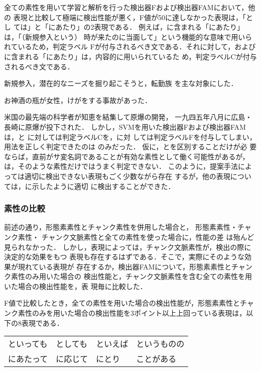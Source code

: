 \documentclass[japanese]{jnlp_1.2d}
\newlength{\NearBaselineskip}
\newcommand{\uline}[1]{}
\newcounter{example}
\newenvironment{example}{}{}
\newcommand{\strref}[1]{}
\newcommand{\tabref}[1]{}
\begin{document}
全ての素性を用いて学習と解析を行った検出器Fおよび検出器FAMにおいて，他の
表現と比較して極端に検出性能が悪く，F値が50に達しなかった表現は，「とし
ては」と「にあたり」の2表現である．
例えば，\strref{ex:niatari-F}に含まれる「にあたり」は，「（新規参入という） 
時が来たのに当面して」という機能的な意味で用いられているため，判定ラベル
Fが付与されるべき文である．それに対して，\strref{ex:niatari-C}および
\strref{ex:niatari-C2}に含まれる「にあたり」は，内容的に用いられているた
め，判定ラベルCが付与されるべき文である．
\begin{example}
  \item 新規参入{\kern0pt}\uline{にあたり}，潜在的なニーズを掘り起こそうと，転勤族
	を主な対象にした．\label{ex:niatari-F} 
  \item お神酒の瓶が女性{\kern0pt}\uline{にあたり}，けがをする事故があった．
	\label{ex:niatari-C} 
  \item 米国の最先端の科学者が知恵を結集して原爆の開発{\kern0pt}\uline{にあたり}，
	一九四五年八月に広島・長崎に原爆が投下された．
	\label{ex:niatari-C2} 
\end{example}
しかし，SVMを用いた検出器Fおよび検出器FAMは，\strref{ex:niatari-F}と
\strref{ex:niatari-C}に対しては判定ラベルCを，\strref{ex:niatari-C2}に対
しては判定ラベルFを付与してしまい，用法を正しく判定できたのは
\strref{ex:niatari-C}のみだった．
仮に，\strref{ex:niatari-F}と\strref{ex:niatari-C}を区別することだけが必
要ならば，直前がサ変名詞であることが有効な素性として働く可能性があるが，
\strref{ex:niatari-C2}は，そのような素性だけではうまく判定できない．
このように，提案手法によっては適切に検出できない表現もごく少数ながら存在
するが，他の表現については，\tabref{tab:kekka_gaiyou}に示したように適切
に検出することができた．


\subsubsection{素性の比較}
前述の通り，形態素素性とチャンク素性を併用した場合と，
\pagebreak
形態素素性・チャンク素性・
チャンク文脈素性と全ての素性を使った場合に，性能の差
は殆んど見られなかった．
しかし，表現によっては，チャンク文脈素性が，検出の際に決定的な効果をもつ
表現も存在するはずである．そこで，実際にそのような効果が現れている表現が
存在するか，検出器FAMについて，形態素素性とチャンク素性のみ用いた場合の
検出性能と，チャンク文脈素性を含む全ての素性を用いた場合の検出性能を，表
現毎に比較した．

F値で比較したとき，全ての素性を用いた場合の検出性能が，形態素素性とチャ
ンク素性のみを用いた場合の検出性能を3ポイント以上上回っている表現は，以
下の8表現である．
\vspace{\NearBaselineskip}
\begin{center}
  \begin{tabular}{llll}
    といっても & としても & といえば & というものの \\
    にあたって & に応じて & にとり   & ことがある
  \end{tabular}
\end{center}
\vspace{\NearBaselineskip}
\end{document}
